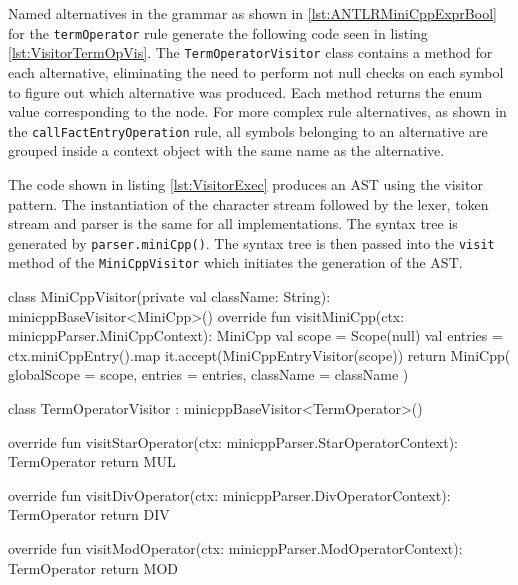 Named alternatives in the grammar as shown in \ref{lst:ANTLRMiniCppExprBool} for the \verb|termOperator| rule generate the following code seen in listing \ref{lst:VisitorTermOpVis}. The \verb|TermOperatorVisitor| class contains a method for each alternative, eliminating the need to perform not null checks on each symbol to figure out which alternative was produced. Each method returns the enum value corresponding to the node. For more complex rule alternatives, as shown in the \verb|callFactEntryOperation| rule, all symbols belonging to an alternative are grouped inside a context object with the same name as the alternative.

The code shown in listing \ref{lst:VisitorExec} produces an AST using the visitor pattern. The instantiation of the character stream followed by the lexer, token stream and parser is the same for all implementations. The syntax tree is generated by \verb|parser.miniCpp()|. The syntax tree is then passed into the \verb|visit| method of the \verb|MiniCppVisitor| which initiates the generation of the AST.




\begin{KotlinCode}[float,numbers=none,caption=Implementation of the \texttt{MiniCppVisitor} class., label=lst:VisitorMniCpp]
class MiniCppVisitor(private val className: String): minicppBaseVisitor<MiniCpp>() {
    override fun visitMiniCpp(ctx: minicppParser.MiniCppContext): MiniCpp {
       val scope = Scope(null)
       val entries = ctx.miniCppEntry().map { it.accept(MiniCppEntryVisitor(scope)) }
       return MiniCpp(
           globalScope = scope,
           entries = entries,
           className = className
       )
    }
}
\end{KotlinCode}


\begin{KotlinCode}[float,numbers=none,caption=Implementation of the \texttt{TermOperatorVisitor} class., label=lst:VisitorTermOpVis]
class TermOperatorVisitor : minicppBaseVisitor<TermOperator>() {
    override fun visitStarOperator(ctx: minicppParser.StarOperatorContext): TermOperator {
        return MUL
    }

    override fun visitDivOperator(ctx: minicppParser.DivOperatorContext): TermOperator {
        return DIV
    }

    override fun visitModOperator(ctx: minicppParser.ModOperatorContext): TermOperator {
        return MOD
    }
}
\end{KotlinCode}

